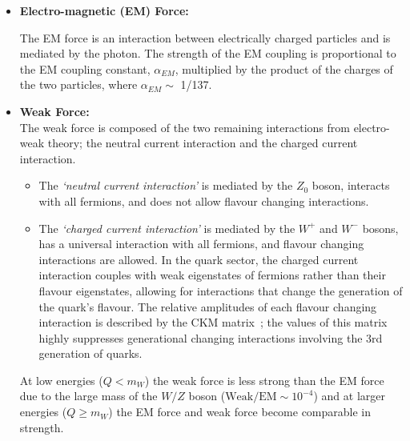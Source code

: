 \begin{itemize}[leftmargin=*]
\item\textbf{Electro-magnetic (EM) Force:}

  The EM force is an interaction between electrically charged particles and is mediated by the photon.
  The strength of the EM coupling is proportional to the EM coupling constant, $\alpha_{EM}$,
  multiplied by the product of the charges of the two particles, where $\alpha_{EM} \sim$ 1/137.\vspace{1em} %

\item\textbf{Weak Force:} \\
  The weak force is composed of the two remaining interactions from electro-weak theory;
  the neutral current interaction and the charged current interaction.
  \begin{itemize}[leftmargin=*]  
  \item The \textit{`neutral current interaction'} is mediated by the $Z_0$ boson, interacts with all fermions,
    and does not allow flavour changing interactions.
  \item The \textit{`charged current interaction'} is mediated by the $W^+$ and $W^-$ bosons,
    has a universal interaction with all fermions,
    and flavour changing interactions are allowed.
    In the quark sector, the charged current interaction
    couples with weak eigenstates of fermions rather than their flavour eigenstates,
    allowing for interactions that change the generation of the quark's flavour.
    The relative amplitudes of each flavour changing interaction is described by the CKM matrix~\cite{theo-ckm};
    the values of this matrix highly suppresses generational changing interactions involving the 3rd generation of quarks.
  \end{itemize}
  At low energies ($Q < m_W$) the weak force is less strong than the EM force due to the large mass of the $W/Z$ boson
  \mbox{($\text{Weak}/\text{EM} \sim 10^{-4}$)} and at larger energies ($Q \geq m_W$)
  the EM force and weak force become comparable in strength.\vspace{1em} %
  

\end{itemize}
